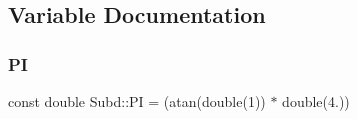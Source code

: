 \subsection{Variable Documentation}
\mbox{\label{namespaceSubd_ace729813ef603fd0775fe11788d9ad07}} 
\subsubsection{\texorpdfstring{PI}{PI}}
{\footnotesize\ttfamily const double Subd\+::\+PI = (atan(double(1)) $\ast$ double(4.))}

